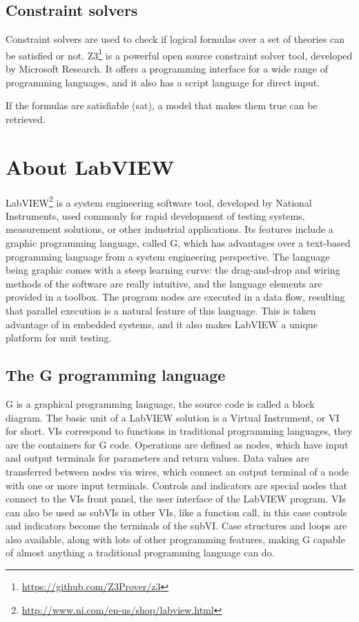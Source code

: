 \subsection{Constraint solvers}
Constraint solvers are used to check if logical formulas over a set of theories can be satisfied or not. Z3\footnote{\url{https://github.com/Z3Prover/z3}} is a powerful open source constraint solver tool, developed by Microsoft Research. It offers a programming interface for a wide range of programming languages, and it also has a script language for direct input.

If the formulas are satisfiable (sat), a model that makes them true can be retrieved. \cite{z3_tutorial}
\section{About LabVIEW}
LabVIEW\footnote{\url{http://www.ni.com/en-us/shop/labview.html}} is a system engineering software tool, developed by National Instruments, used commonly for rapid development of testing systems, measurement solutions, or other industrial applications. Its features include a graphic programming language, called G, which has advantages over a text-based programming language from a system engineering perspective. The language being graphic comes with a steep learning curve: the drag-and-drop and wiring methods of the software are really intuitive, and the language elements are provided in a toolbox. The program nodes are executed in a data flow, resulting that parallel execution is a natural feature of this language. This is taken advantage of in embedded systems, and it also makes LabVIEW a unique platform for unit testing.
\subsection{The G programming language}
G is a graphical programming language, the source code is called a block diagram. The basic unit of a LabVIEW solution is a Virtual Instrument, or VI for short. VIs correspond to functions in traditional programming languages, they are the containers for G code. Operations are defined as nodes, which have input and output terminals for parameters and return values. Data values are transferred between nodes via wires, which connect an output terminal of a node with one or more input terminals. Controls and indicators are special nodes that connect to the VIs front panel, the user interface of the LabVIEW program. VIs can also be used as subVIs in other VIs, like a function call, in this case controls and indicators become the terminals of the subVI. Case structures and loops are also available, along with lots of other programming features, making G capable of almost anything a traditional programming language can do.

